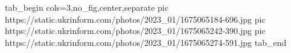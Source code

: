  
 
 
 
 

\ifcmt
  tab_begin cols=3,no_fig,center,separate
     pic https://static.ukrinform.com/photos/2023_01/1675065184-696.jpg
     pic https://static.ukrinform.com/photos/2023_01/1675065242-390.jpg
     pic https://static.ukrinform.com/photos/2023_01/1675065274-591.jpg
  tab_end
\fi
